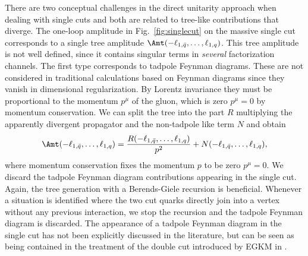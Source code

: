 There are two conceptual
challenges in the direct unitarity approach when dealing with single cuts and both are
related to tree-like contributions that diverge. The one-loop amplitude in
Fig.~\ref{fig:singlecut} on the massive single cut corresponds to a single
tree amplitude $\Amt(-\ell_{1,\bar{q}},\dots,\ell_{1,q})$. This tree amplitude is not well
defined, since it contains singular terms in \textit{several}
factorization channels. The first type corresponds to tadpole Feynman
diagrams. These are not considered in traditional calculations based
on Feynman diagrams since they vanish in dimensional regularization. By Lorentz invariance they must be proportional to the momentum $p^\mu$ of the
gluon, which is zero $p^\mu=0$ by momentum conservation. We can
split the tree into the part $R$ multiplying the apparently divergent
propagator and the non-tadpole like term $N$ and obtain
\begin{align}\label{eq:scparts}
  \Amt(-\ell_{1,\bar{q}},\dots,\ell_{1,q})=\frac{R(-\ell_{1,\bar{q}},\dots,\ell_{1,q})}{p^2}+N(-\ell_{1,\bar{q}},\dots,\ell_{1,q}),
\end{align}
where momentum conservation fixes the momentum $p$ to be
zero $p^\mu=0$. We discard the tadpole Feynman diagram contributions appearing in
the single cut. Again, the tree generation with a Berends-Giele
recursion is beneficial. Whenever a
situation is identified where the two cut quarks directly join into a
vertex without any previous interaction, we stop the recursion and the
tadpole Feynman diagram is discarded. The appearance of a tadpole
Feynman diagram in the single cut has not been explicitly discussed in
the literature, but can be seen as being contained in the treatment of
the double cut introduced by EGKM in \cite{Ellis:2008ir}.

